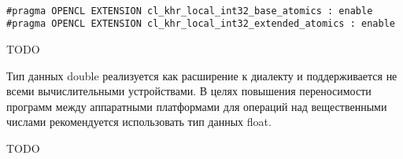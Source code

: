 \begin{lstlisting}

#pragma OPENCL EXTENSION cl_khr_local_int32_base_atomics : enable
#pragma OPENCL EXTENSION cl_khr_local_int32_extended_atomics : enable

\end{lstlisting}
\mylistingend


		TODO


		Тип данных double реализуется как расширение к диалекту и поддерживается не всеми вычислительными устройствами. В целях повышения переносимости программ между аппаратными платформами для операций над вещественными числами рекомендуется использовать тип данных float.


	TODO


